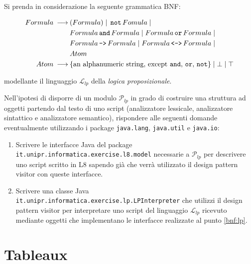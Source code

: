 \documentclass[12pt,a4paper]{article}
\begin{document}
    \begin{Exercise}
    Si prenda in considerazione la seguente grammatica BNF:
    
	\begin{align*}
	Formula \:\longrightarrow\: &(Formula) {\;|\;} \,\texttt{not}\, Fomula {\;|\;}\\
			 & Formula \,\texttt{and}\, Formula {\;|\;} Formula \,\texttt{or}\, Formula {\;|\;}\\
			 & Formula \,\texttt{->}\, Formula {\;|\;} Formula \,\texttt{<->}\, Formula {\;|\;}\\
			 & Atom \\
	Atom \:\longrightarrow\: &\text{\{an alphanumeric string, except \texttt{and}, \texttt{or}, \texttt{not}\}} {\;|\;} \bot {\;|\;} \top
	\end{align*}
	
	modellante il linguaggio $\mathcal{L}_{lp}$ della \textit{logica proposizionale}.
	
	Nell’ipotesi di disporre di un modulo $\mathcal{P}_{lp}$ in grado di
	costruire una struttura ad oggetti partendo dal testo di uno script
	(analizzatore lessicale, analizzatore sintattico e analizzatore 
	semantico),	rispondere alle seguenti domande eventualmente utilizzando 
	i package \texttt{java.lang}, \texttt{java.util} e \texttt{java.io}:
	
	\begin{enumerate}
	\item\label{bnf:lp} Scrivere le interfacce Java del package
		\texttt{it.unipr.informatica.exercise.l8.model} necessarie a 
		$\mathcal{P}_{lp}$ per 
		descrivere uno script scritto in L8 sapendo già che verrà utilizzato 
		il design pattern visitor con queste interfacce.
	
	\item Scrivere una classe Java \texttt{it.unipr.informatica.exercise.lp.LPInterpreter} che utilizzi il
design pattern visitor per interpretare uno script del linguaggio $\mathcal{L}_{lp}$ ricevuto mediante oggetti che implementano le interfacce realizzate al punto \ref{bnf:lp}.
	\end{enumerate}
    
    \end{Exercise}

\section{Tableaux}
\end{document}
